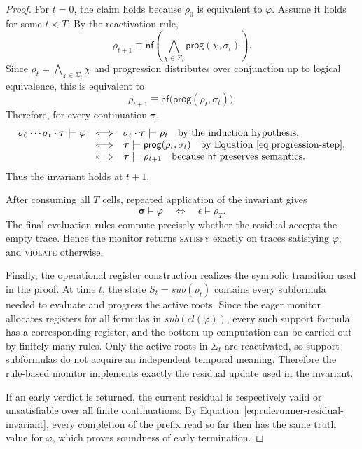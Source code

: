 \begin{proof}
For $t=0$, the claim holds because $\rho_0$ is equivalent to $\varphi$. Assume it holds for some $t<T$. By the reactivation rule,
\[
    \rho_{t+1}
    \equiv
    \mathsf{nf}\left(
        \bigwedge_{\chi\in\Sigma_t}\mathsf{prog}(\chi,\sigma_t)
    \right).
\]
Since $\rho_t=\bigwedge_{\chi\in\Sigma_t}\chi$ and progression distributes over conjunction up to logical equivalence, this is equivalent to
\[
    \rho_{t+1}
    \equiv
    \mathsf{nf}\bigl(\mathsf{prog}(\rho_t,\sigma_t)\bigr).
\]
Therefore, for every  continuation $\boldsymbol{\tau}$,
\[
\begin{array}{rcl}
\sigma_0\cdots\sigma_t\cdot\boldsymbol{\tau}\models\varphi
&\Longleftrightarrow&
\sigma_t\cdot\boldsymbol{\tau}\models\rho_t
\quad\text{by the induction hypothesis,}\\
&\Longleftrightarrow&
\boldsymbol{\tau}\models\mathsf{prog}(\rho_t,\sigma_t)
\quad\text{by Equation~\eqref{eq:progression-step},}\\
&\Longleftrightarrow&
\boldsymbol{\tau}\models\rho_{t+1}
\quad\text{because $\mathsf{nf}$ preserves semantics.}
\end{array}
\]
Thus the invariant holds at $t+1$.

After consuming all $T$ cells, repeated application of the invariant gives
\[
    \boldsymbol{\sigma}\models\varphi
    \quad\Longleftrightarrow\quad
    \epsilon\models\rho_T.
\]
The final evaluation rules compute precisely whether the residual accepts the empty trace. Hence the monitor returns \textsc{satisfy} exactly on traces satisfying $\varphi$, and \textsc{violate} otherwise.

Finally, the operational register construction realizes the symbolic transition used in the proof. At time $t$, the state $S_t=sub(\rho_t)$ contains every subformula needed to evaluate and progress the active roots. Since the eager monitor allocates registers for all formulas in $sub(cl(\varphi))$, every such support formula has a corresponding register, and the bottom-up computation can be carried out by finitely many rules. Only the active roots in $\Sigma_t$ are reactivated, so support subformulas do not acquire an independent temporal meaning. Therefore the rule-based monitor implements exactly the residual update used in the invariant.

If an early verdict is returned, the current residual is respectively valid or unsatisfiable over all finite continuations. By Equation~\eqref{eq:rulerunner-residual-invariant}, every completion of the prefix read so far then has the same truth value for $\varphi$, which proves soundness of early termination.
\end{proof}


